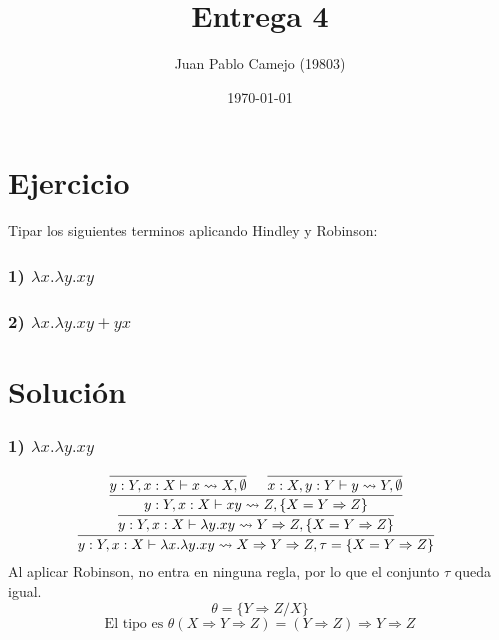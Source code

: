 \documentclass[a4paper,10pt]{article} %
\title{Entrega 4}
\author{Juan Pablo Camejo (19803)}
\date{\today}  %
\newcommand{\En}[0]{\Rightarrow}
\begin{document}
\maketitle   %

\section*{Ejercicio}
Tipar los siguientes terminos aplicando Hindley y Robinson: 
\subsubsection*{1) $\lambda x.\lambda y .xy$}
\subsubsection*{2) $\lambda x.\lambda y .xy+yx$}


\section*{Solución}



\subsubsection*{1) $\lambda x.\lambda y .xy$}
$$
\infer[]{ y:Y, x:X \vdash \lambda x.\lambda y.xy \leadsto  X \En Y \En Z, \tau = \{X=Y\En Z\} }{
\infer[]{ y:Y, x:X \vdash \lambda y.xy \leadsto Y \En Z,\{X=Y\En Z\} }{
\infer[]{ y:Y, x:X \vdash xy \leadsto Z,\{X=Y\En Z\} }{
    \infer[]{ y:Y, x:X \vdash x \leadsto X,\emptyset}{} &  \infer[]{x:X, y:Y \vdash y \leadsto Y,\emptyset}{}}
}}
$$
Al aplicar Robinson, no entra en ninguna regla, por lo que el conjunto $\tau$ queda igual.\\ 
$$\theta=\{Y\En Z/X\}$$
$$ 
    \text{El tipo es }\theta(X \En Y \En Z) = (Y \En Z) \En Y \En Z
$$
\end{document}
